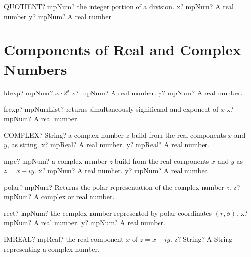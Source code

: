\documentclass[12pt,a4paper,openany]{book}
\begin{document}
\begin{mpFunctionsExtract}
\mpWorksheetFunctionTwoNotImplemented
{QUOTIENT? mpNum? the integer portion of a division.}
{x? mpNum? A real number}
{y? mpNum? A real number}
\end{mpFunctionsExtract}

\section{Components of Real and Complex Numbers}

\begin{mpFunctionsExtract}
\mpFunctionTwo
{ldexp? mpNum? $x \cdot 2^{y}$}
{x? mpNum? A real number.}
{y? mpNum? A real number.}
\end{mpFunctionsExtract}

\begin{mpFunctionsExtract}
\mpFunctionOne
{frexp? mpNumList? returns simultaneously significand and exponent of $x$}
{x? mpNum? A real number.}
\end{mpFunctionsExtract}

\begin{mpFunctionsExtract}
\mpWorksheetFunctionTwoNotImplemented
{COMPLEX? String? a complex number $z$ build from the real components $x$ and $y$, as string.}
{x? mpReal? A real number.}
{y? mpReal? A real number.}
\end{mpFunctionsExtract}

\begin{mpFunctionsExtract}
\mpFunctionTwo
{mpc? mpNum? a complex number $z$ build from the real components $x$ and $y$ as $z=x+iy$.}
{x? mpNum? A real number.}
{y? mpNum? A real number.}
\end{mpFunctionsExtract}

\begin{mpFunctionsExtract}
\mpFunctionOne
{polar? mpNum? Returns the polar representation of the complex number $z$.}
{z? mpNum? A complex or real number.}
\end{mpFunctionsExtract}

\begin{mpFunctionsExtract}
\mpFunctionTwo
{rect? mpNum? the complex number represented by polar coordinates $(r,\phi)$.}
{x? mpNum? A real number.}
{y? mpNum? A real number.}
\end{mpFunctionsExtract}

\begin{mpFunctionsExtract}
\mpWorksheetFunctionOneNotImplemented
{IMREAL? mpReal? the real component $x$ of $z=x+iy$.}
{z? String? A String representing a complex number.}
\end{mpFunctionsExtract}
\end{document}

